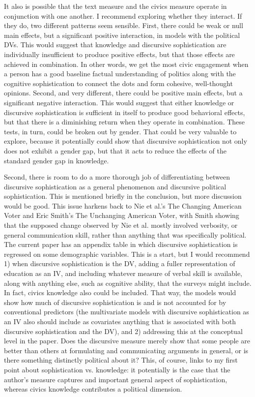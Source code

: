 It also is possible that the text measure and the civics measure operate in conjunction with one another. I recommend exploring whether they interact. If they do, two different patterns seem sensible. First, there could be weak or null main effects, but a significant positive interaction, in models with the political DVs. This would suggest that knowledge and discursive sophistication are individually insufficient to produce positive effects, but that those effects are achieved in combination. In other words, we get the most civic engagement when a person has a good baseline factual understanding of politics along with the cognitive sophistication to connect the dots and form cohesive, well-thought opinions. Second, and very different, there could be positive main effects, but a significant negative interaction. This would suggest that either knowledge or discursive sophistication is sufficient in itself to produce good behavioral effects, but that there is a diminishing
return when they operate in combination. These tests, in turn, could be broken out by gender. That could be very valuable to explore, because it potentially could show that discursive sophistication not only does not exhibit a gender gap, but that it acts to reduce the effects of the standard gender gap in knowledge.

Second, there is room to do a more thorough job of differentiating between discursive sophistication as a general phenomenon and discursive political sophistication. This is mentioned briefly in the conclusion, but more discussion would be good. This issue harkens back to Nie et al.'s The Changing American Voter and Eric Smith's The Unchanging American Voter, with Smith showing that the supposed change observed by Nie et al. mostly involved verbosity, or general communication skill, rather than anything that was specifically political. The current paper has an appendix table in which discursive sophistication is regressed on some demographic variables. This is a start, but I would recommend 1) when discursive sophistication is the DV, adding a fuller representation of education as an IV, and including whatever measure of verbal skill is available, along with anything else, such as cognitive ability, that the surveys might include. In fact, civics knowledge also could be
included. That way, the models would show how much of discursive sophistication is and is not accounted for by conventional predictors (the multivariate models with discursive sophistication as an IV also should include as covariates anything that is associated with both discursive sophistication and the DV), and 2) addressing this at the conceptual level in the paper. Does the discursive measure merely show that some people are better than others at formulating and communicating arguments in general, or is there something distinctly political about it? This, of course, links to my first point about sophistication vs. knowledge: it potentially is the case that the author's measure captures and important general aspect of sophistication, whereas civics knowledge contributes a political dimension.

